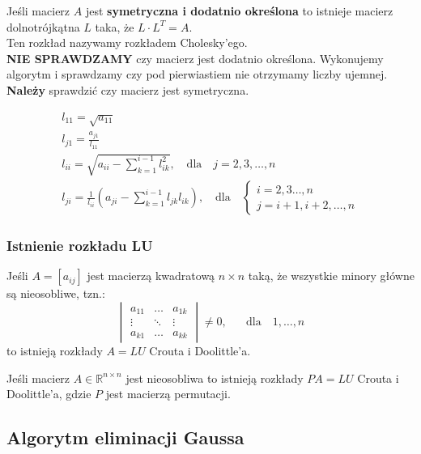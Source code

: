 \documentclass[../mn-notatki.tex]{subfiles}
\begin{document}
\begin{tcolorbox}
Jeśli macierz $A$ jest \textbf{symetryczna i dodatnio określona} to istnieje
macierz dolnotrójkątna $L$ taka, że $L\cdot L^T = A$.\\
Ten rozkład nazywamy rozkładem Cholesky'ego.\\

\textbf{NIE SPRAWDZAMY} czy macierz jest dodatnio określona. Wykonujemy
algorytm i sprawdzamy czy pod pierwiastiem nie otrzymamy liczby ujemnej.\\
\textbf{Należy} sprawdzić czy macierz jest symetryczna.
\end{tcolorbox}
\begin{gather*}
l_{11} = \sqrt{a_{11}}\\
l_{j1} = \frac{a_{j1}}{l_{11}}\\
l_{ii} = \sqrt{a_{ii} - \sum_{k=1}^{i-1} l_{ik}^2}, \text{~~ dla ~~} j = 2, 3, \ldots, n\\
l_{ji} = \frac{1}{l_{ii}} \left( a_{ji} - \sum_{k=1}^{i-1} l_{jk} l_{ik} \right),
\text{~~ dla ~~}
\begin{cases}
i = 2,3 \ldots, n\\
j = i +1, i+2, \ldots, n
\end{cases}
\end{gather*}

\subsubsection{Istnienie rozkładu LU}

\begin{tcolorbox}
Jeśli $A = [a_{ij}]$ jest macierzą kwadratową $n\times n$ taką, że wszystkie
minory główne są nieosobliwe, tzn.:
\[
\begin{vmatrix}
a_{11} & \ldots & a_{1k}\\
\vdots & \ddots & \vdots\\
a_{k1} & \ldots & a_{kk}
\end{vmatrix} \neq 0, \text{~~~~~dla~~~} 1,\ldots,n
\]
to istnieją rozkłady $A = LU$ Crouta i Doolittle'a.
\end{tcolorbox}
\begin{tcolorbox}
Jeśli macierz $A \in \mathbb{R}^{n\times n}$ jest nieosobliwa to istnieją
rozkłady $PA = LU$ Crouta i Doolittle'a, gdzie $P$ jest macierzą permutacji.
\end{tcolorbox}

\subsection{Algorytm eliminacji Gaussa}
\end{document}
